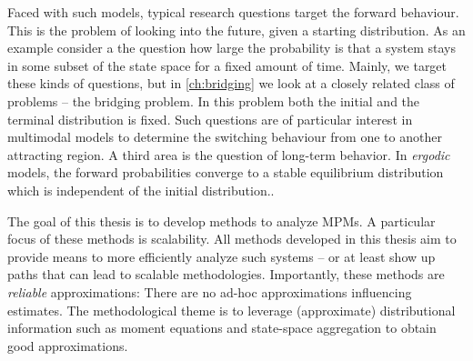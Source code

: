 Faced with such models, typical research questions target the forward behaviour.
This is the problem of looking into the future, given a starting distribution.
As an example consider a the question how large the probability is that a system stays in some subset of the state space for a fixed amount of time.
Mainly, we target these kinds of questions, but in \autoref{ch:bridging} we look at a closely
related class of problems -- the bridging problem.
In this problem both the initial and the terminal distribution is fixed.
Such questions are of particular interest in multimodal models to determine the switching behaviour from one to another attracting region.
A third area is the question of long-term behavior.
In \emph{ergodic} models, the forward probabilities converge to a stable equilibrium distribution which is independent of the initial distribution..

The goal of this thesis is to develop methods to analyze \acp{MPM}.
A particular focus of these methods is scalability.
All methods developed in this thesis aim to provide means to more efficiently analyze such systems -- or at least show up paths that can lead to scalable methodologies.
Importantly, these methods are \emph{reliable} approximations: There are no ad-hoc approximations influencing estimates.
The methodological theme is to leverage (approximate) distributional information such as moment equations and state-space aggregation to obtain good approximations.



